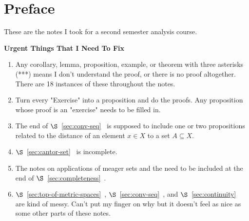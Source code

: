 \documentclass[10pt,twoside,openany]{memoir}
\begin{document}
    \tableofcontents

    \chapter*{Preface}
    These are the notes I took for a second semester analysis course. \nl
    
    \iffalse
    \noindent \textbf{Urgent Things That I Need To Fix}
    \begin{enumerate}[label = (\arabic*),itemsep=1pt,topsep=3pt]
        \item Any corollary, lemma, proposition, example, or theorem with three asterisks (***) means I don't understand the proof, or there is no proof altogether. There are 18 instances of these throughout the notes.
        \item Turn every "Exercise" into a proposition and do the proofs. Any proposition whose proof is an "exercise" needs to be filled in.
        \item The end of $\S$~\ref{sec:conv-seq}~ is supposed to include one or two propositions related to the distance of an element $x \in X$ to a set $A \subseteq X$.
        \item $\S$~\ref{sec:cantor-set}~ is incomplete. 
        \item The notes on applications of meager sets and the  need to be included at the end of $\S$~\ref{sec:completeness}~.
        \item $\S$~\ref{sec:top-of-metric-spaces}~, $\S$~\ref{sec:conv-seq}~, and $\S$~\ref{sec:continuity}~ are kind of messy. Can't put my finger on why but it doesn't feel as nice as some other parts of these notes.
    \end{enumerate}
\end{document}
